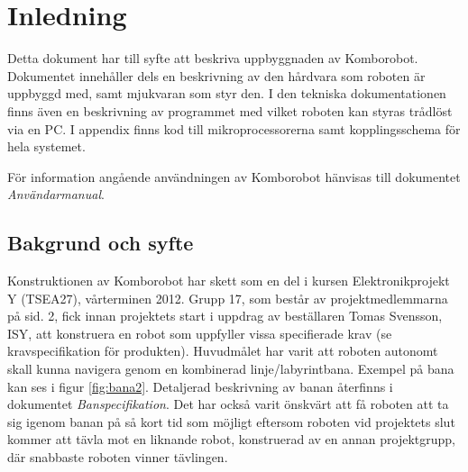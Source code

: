 
%
%


\section{Inledning}
Detta dokument har till syfte att beskriva uppbyggnaden av Komborobot.
Dokumentet innehåller dels en beskrivning av den hårdvara som roboten är 
uppbyggd med, samt mjukvaran som styr den. I den tekniska dokumentationen 
finns även en beskrivning av programmet med vilket roboten kan styras 
trådlöst via en PC. I appendix finns kod till mikroprocessorerna samt
kopplingsschema för hela systemet. 

För information angående användningen av Komborobot hänvisas till dokumentet 
\emph{Användarmanual}. 

\subsection{Bakgrund och syfte}
Konstruktionen av Komborobot har skett som en del i kursen Elektronikprojekt 
Y (TSEA27), vårterminen 2012. Grupp 17, som består av projektmedlemmarna på 
sid. 2, fick innan projektets start i uppdrag av beställaren Tomas Svensson, 
ISY, att konstruera en robot som uppfyller vissa specifierade krav (se 
kravspecifikation för produkten). Huvudmålet har varit att roboten autonomt 
skall kunna navigera genom en kombinerad linje/labyrintbana. Exempel på bana 
kan ses i figur \ref{fig:bana2}. Detaljerad beskrivning av banan återfinns i dokumentet 
\emph{Banspecifikation}. Det har också varit önskvärt att få roboten att ta sig 
igenom banan på så kort tid som möjligt  eftersom roboten vid projektets slut 
kommer att tävla mot en liknande robot, konstruerad av en annan projektgrupp, 
där snabbaste roboten vinner tävlingen.


